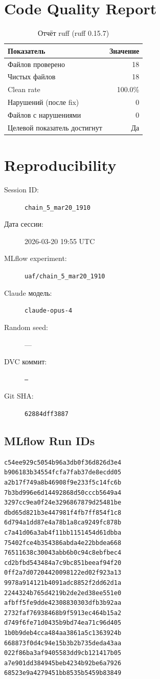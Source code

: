 \documentclass[12pt,a4paper]{article}
\begin{document}
\section{Code Quality Report}

\begin{table}[H]
\centering
\caption{Отчёт ruff (ruff 0.15.7)}
\begin{tabular}{lr}
\toprule
Показатель & Значение \\
\midrule
Файлов проверено & 18 \\
Чистых файлов & 18 \\
Clean rate & \textcolor{passcolor}{100.0\%} \\
Нарушений (после fix) & \textcolor{passcolor}{0} \\
Файлов с нарушениями & 0 \\
Целевой показатель достигнут & \textcolor{passcolor}{Да} \\
\bottomrule
\end{tabular}
\end{table}





\section{Reproducibility}

\begin{description}
    \item[Session ID:] \texttt{chain\_5\_mar20\_1910}
    \item[Дата сессии:] 2026-03-20 19:55 UTC
    \item[MLflow experiment:] \texttt{uaf/chain\_5\_mar20\_1910}
    \item[Claude модель:] \texttt{claude-opus-4}
    \item[Random seed:] ---
    \item[DVC коммит:] \texttt{---}
    \item[Git SHA:] \texttt{62884dff3887}
\end{description}

\subsection*{MLflow Run IDs}

\begin{lstlisting}
c54ee929c5054b96a3db0f36d826d3e4
b906183b34554fcfa7fab37de8ecdd05
a2b17f749a8b46908f9e233f5c14fc6b
7b3bd996e6d14492868d50cccb5649a4
3297cc9ea0f24e3296867879d25481be
dbd65d821b3e447981f4fb7ff854f1c8
6d794a1dd87e4a78b1a8ca9249fc878b
c7a41d06a3ab4f11bb1151454d61dbba
75402fce4b354386abda4e22bbdea668
76511638c30043abb6b0c94c8ebfbec4
cd2bfbd543484a7c9bc851beeaf94f20
0ff2a7d07204420098122ed02f923a13
9978a914121b4091adc8852f2dd62d1a
2244324b765d4219b2de2ed38ee551e0
afbff5fe9dde42308830303dfb3b92aa
2732faf76938468b9f5913ec464b15a2
d749f6fe71d0435b9bd74ea71c96d405
1b0b9deb4cca484aa3861a5c1363924b
668873f0d4c94e15b3b2b735deda43aa
022f86ba3af9405583dd9cb121417b05
a7e901dd384945beb4234b92be6a7926
68523e9a4279451bb8535b5459b83849
\end{lstlisting}
\end{document}
